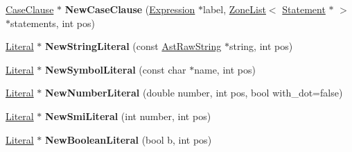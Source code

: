 \begin{DoxyCompactItemize}
\item 
\hyperlink{classv8_1_1internal_1_1_case_clause}{Case\+Clause} $\ast$ {\bfseries New\+Case\+Clause} (\hyperlink{classv8_1_1internal_1_1_expression}{Expression} $\ast$label, \hyperlink{classv8_1_1internal_1_1_zone_list}{Zone\+List}$<$ \hyperlink{classv8_1_1internal_1_1_statement}{Statement} $\ast$ $>$ $\ast$statements, int pos)\hypertarget{classv8_1_1internal_1_1_b_a_s_e___e_m_b_e_d_d_e_d_a98e3fa1bf4969174121b5abca803d121}{}\label{classv8_1_1internal_1_1_b_a_s_e___e_m_b_e_d_d_e_d_a98e3fa1bf4969174121b5abca803d121}

\item 
\hyperlink{classv8_1_1internal_1_1_literal}{Literal} $\ast$ {\bfseries New\+String\+Literal} (const \hyperlink{classv8_1_1internal_1_1_ast_raw_string}{Ast\+Raw\+String} $\ast$string, int pos)\hypertarget{classv8_1_1internal_1_1_b_a_s_e___e_m_b_e_d_d_e_d_ae6be1c2726b90fce7052fa504a42169c}{}\label{classv8_1_1internal_1_1_b_a_s_e___e_m_b_e_d_d_e_d_ae6be1c2726b90fce7052fa504a42169c}

\item 
\hyperlink{classv8_1_1internal_1_1_literal}{Literal} $\ast$ {\bfseries New\+Symbol\+Literal} (const char $\ast$name, int pos)\hypertarget{classv8_1_1internal_1_1_b_a_s_e___e_m_b_e_d_d_e_d_a00c8bad29fe347bd1768d80ee35245f2}{}\label{classv8_1_1internal_1_1_b_a_s_e___e_m_b_e_d_d_e_d_a00c8bad29fe347bd1768d80ee35245f2}

\item 
\hyperlink{classv8_1_1internal_1_1_literal}{Literal} $\ast$ {\bfseries New\+Number\+Literal} (double number, int pos, bool with\+\_\+dot=false)\hypertarget{classv8_1_1internal_1_1_b_a_s_e___e_m_b_e_d_d_e_d_a2d3007bf07326d0730221f141da86676}{}\label{classv8_1_1internal_1_1_b_a_s_e___e_m_b_e_d_d_e_d_a2d3007bf07326d0730221f141da86676}

\item 
\hyperlink{classv8_1_1internal_1_1_literal}{Literal} $\ast$ {\bfseries New\+Smi\+Literal} (int number, int pos)\hypertarget{classv8_1_1internal_1_1_b_a_s_e___e_m_b_e_d_d_e_d_a0e34b934a4ca100df032ba1bd1e879c5}{}\label{classv8_1_1internal_1_1_b_a_s_e___e_m_b_e_d_d_e_d_a0e34b934a4ca100df032ba1bd1e879c5}

\item 
\hyperlink{classv8_1_1internal_1_1_literal}{Literal} $\ast$ {\bfseries New\+Boolean\+Literal} (bool b, int pos)\hypertarget{classv8_1_1internal_1_1_b_a_s_e___e_m_b_e_d_d_e_d_aa9f6b20fc2df1258110d99f66e4b901c}{}\label{classv8_1_1internal_1_1_b_a_s_e___e_m_b_e_d_d_e_d_aa9f6b20fc2df1258110d99f66e4b901c}


\end{DoxyCompactItemize}
